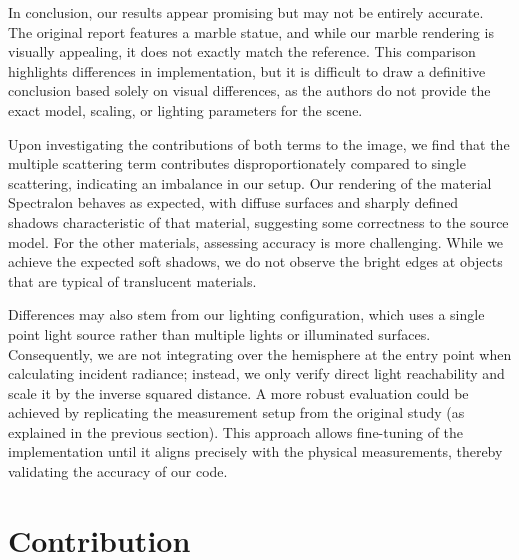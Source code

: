 \documentclass[sigconf,nonacm]{acmart}
\begin{document}
In conclusion, our results appear promising but may not be entirely accurate. The original report features a marble statue, and while our marble rendering is visually appealing, it does not exactly match the reference. This comparison highlights differences in implementation, but it is difficult to draw a definitive conclusion based solely on visual differences, as the authors do not provide the exact model, scaling, or lighting parameters for the scene.

Upon investigating the contributions of both terms to the image, we find that the multiple scattering term contributes disproportionately compared to single scattering, indicating an imbalance in our setup. Our rendering of the material Spectralon behaves as expected, with diffuse surfaces and sharply defined shadows characteristic of that material, suggesting some correctness to the source model. For the other materials, assessing accuracy is more challenging. While we achieve the expected soft shadows, we do not observe the bright edges at objects that are typical of translucent materials.

Differences may also stem from our lighting configuration, which uses a single point light source rather than multiple lights or illuminated surfaces. Consequently, we are not integrating over the hemisphere at the entry point when calculating incident radiance; instead, we only verify direct light reachability and scale it by the inverse squared distance. A more robust evaluation could be achieved by replicating the measurement setup from the original study (as explained in the previous section). This approach allows fine-tuning of the implementation until it aligns precisely with the physical measurements, thereby validating the accuracy of our code.

\section{Contribution}




\end{document}
